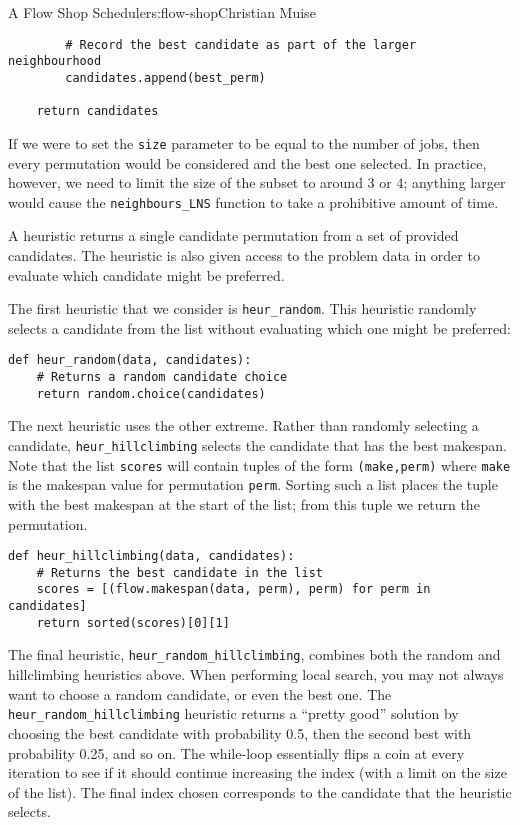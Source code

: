 \begin{aosachapter}{A Flow Shop Scheduler}{s:flow-shop}{Christian Muise}
\begin{verbatim}
        # Record the best candidate as part of the larger neighbourhood
        candidates.append(best_perm)

    return candidates
\end{verbatim}

If we were to set the \texttt{size} parameter to be equal to the number
of jobs, then every permutation would be considered and the best one
selected. In practice, however, we need to limit the size of the subset
to around 3 or 4; anything larger would cause the
\texttt{neighbours\_LNS} function to take a prohibitive amount of time.

\label{heuristics}

A heuristic returns a single candidate permutation from a set of
provided candidates. The heuristic is also given access to the problem
data in order to evaluate which candidate might be preferred.

The first heuristic that we consider is \texttt{heur\_random}. This
heuristic randomly selects a candidate from the list without evaluating
which one might be preferred:

\begin{verbatim}
def heur_random(data, candidates):
    # Returns a random candidate choice
    return random.choice(candidates)
\end{verbatim}

The next heuristic uses the other extreme. Rather than randomly
selecting a candidate, \texttt{heur\_hillclimbing} selects the candidate
that has the best makespan. Note that the list \texttt{scores} will
contain tuples of the form \texttt{(make,perm)} where \texttt{make} is
the makespan value for permutation \texttt{perm}. Sorting such a list
places the tuple with the best makespan at the start of the list; from
this tuple we return the permutation.

\begin{verbatim}
def heur_hillclimbing(data, candidates):
    # Returns the best candidate in the list
    scores = [(flow.makespan(data, perm), perm) for perm in candidates]
    return sorted(scores)[0][1]
\end{verbatim}

The final heuristic, \texttt{heur\_random\_hillclimbing}, combines both
the random and hillclimbing heuristics above. When performing local
search, you may not always want to choose a random candidate, or even
the best one. The \texttt{heur\_random\_hillclimbing} heuristic returns
a ``pretty good'' solution by choosing the best candidate with
probability 0.5, then the second best with probability 0.25, and so on.
The while-loop essentially flips a coin at every iteration to see if it
should continue increasing the index (with a limit on the size of the
list). The final index chosen corresponds to the candidate that the
heuristic selects.


\end{aosachapter}
